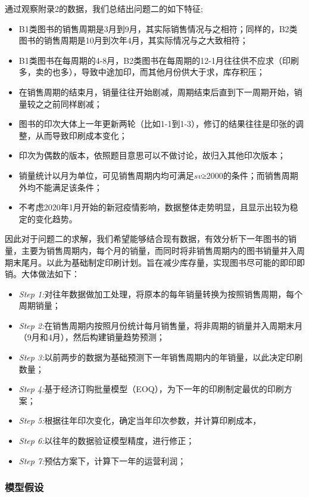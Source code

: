 \documentclass[bwprint]{gmcmthesis}
\begin{document}
通过观察附录2的数据，我们总结出问题二的如下特征;

\begin{itemize}
  \item B1类图书的销售周期是3月到9月，其实际销售情况与之相符；同样的，B2类图书的销售周期是10月到次年4月，其实际情况与之大致相符；
  \item B1类图书在每周期的4-8月，B2类图书在每周期的12-1月往往供不应求（印刷多，卖的也多），导致中途加印，而其他月份供大于求，库存积压；
  \item 在销售周期的结束月，销量往往开始剧减，周期结束后直到下一周期开始，销量较之之前同样剧减；
  \item 图书的印次大体上一年更新两轮（比如1-1到1-3），修订的结果往往是印张的调整，从而导致印刷成本变化；
  \item 印次为偶数的版本，依照题目意思可以不做讨论，故归入其他印次版本；
  \item 销量统计以月为单位，可见销售周期内均可满足$sv$≥2000的条件；而销售周期外均不能满足该条件；
  \item 不考虑2020年1月开始的新冠疫情影响，数据整体走势明显，且显示出较为稳定的变化趋势。
\end{itemize}

因此对于问题二的求解，我们希望能够结合现有数据，有效分析下一年图书的销量，主要为销售周期内，每个月的销量，而同时将非销售周期内的图书销量并入周期末尾月。以此为基础制定印刷计划。旨在减少库存量，实现图书尽可能的即印即销。大体做法如下：

\begin{itemize}
  \item \emph{Step 1:}对往年数据做加工处理，将原本的每年销量转换为按照销售周期，每个周期销量；
  \item \emph{Step 2:}在销售周期内按照月份统计每月销售量，将非周期的销量并入周期末月（9月和4月），然后构建销量趋势预测；
  \item \emph{Step 3:}以前两步的数据为基础预测下一年销售周期内的年销量，以此决定印刷数量；
  \item \emph{Step 4:}基于经济订购批量模型（EOQ），为下一年的印刷制定最优的印刷方案；
  \item \emph{Step 5:}根据往年印次变化，确定当年印次参数，并计算印刷成本，
  \item \emph{Step 6:}以往年的数据验证模型精度，进行修正；
  \item \emph{Step 7:}预估方案下，计算下一年的运营利润；
\end{itemize}

\subsubsection{模型假设}
\end{document}
